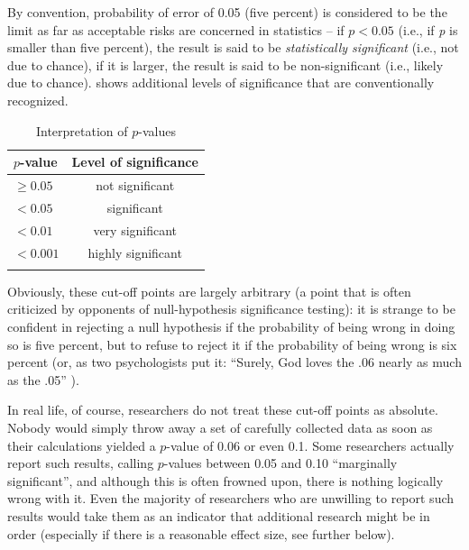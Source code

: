 By convention, probability  of error of 0.05 (five percent) is considered to be the limit as far as acceptable risks are concerned in statistics  -- if $p < 0.05$ (i.e., if \textit{p} is smaller than five percent), the result is said to be \textit{statistically significant}  (i.e., not due to chance),  if it is larger, the result is said to be non\hyp{}significant (i.e., likely due to chance).    shows additional levels of significance that are conventionally recognized.

\begin{table}
\caption{Interpretation of $p$\hyp{}values}
\label{tab:plevels}
\begin{tabular}[t]{lc}
\lsptoprule
$p$\hyp{}value & Level of significance \\
\midrule
$\geq 0.05$ & not significant \\
$< 0.05$ & significant \\
$< 0.01$ & very significant \\
$< 0.001$ & highly significant \\
\lspbottomrule
\end{tabular}
\end{table}

Obviously, these cut\hyp{}off points are largely arbitrary (a point that is often criticized by opponents of null\hyp{}hypothesis significance  testing): it is strange to be confident in rejecting a null hypothesis  if the probability  of being wrong in doing so is five percent, but to refuse to reject it if the probability of being wrong is six percent (or, as two psychologists  put it: ``Surely, God loves the .06 nearly as much as the .05'' \citep[1277]{rosnow_statistical_1989}).\largerpage

In real life, of course, researchers do not treat these cut\hyp{}off points as absolute. Nobody would simply throw away a set of carefully collected data as soon as their calculations yielded a $p$\hyp{}value  of 0.06 or even 0.1. Some researchers actually report such results, calling $p$\hyp{}values between 0.05 and 0.10 ``marginally significant'',  and although this is often frowned upon, there is nothing logically wrong with it. Even the majority of researchers who are unwilling to report such results would take them as an indicator that additional research might be in order (especially if there is a reasonable effect size,  see further below).

